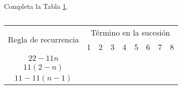 \question[10] Completa la Tabla \ref{tab:3.8}.

\begin{table}[H]
    \centering
    \caption{}
    \label{tab:3.8}
    \begin{tabular}{c|c|c|c|c|c|c|c|c|}
        \multirow{2}{*}{Regla de recurrencia} & \multicolumn{8}{c|}{Término en la sucesión}                             \\ \cline{2-9}
                                              & 1                                           & 2 & 3 & 4 & 5 & 6 & 7 & 8 \\ \hline
        $22-11n$                              &                                             &   &   &   &   &   &   &   \\ \hline
        $11\left(2-n\right)$                  &                                             &   &   &   &   &   &   &   \\ \hline
        $11-11\left(n-1\right)$               &                                             &   &   &   &   &   &   &   \\ \cline{2-9}
    \end{tabular}
\end{table}
